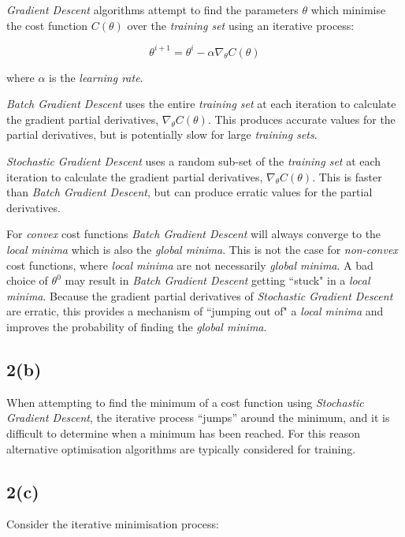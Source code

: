 \documentclass[12pt, a4paper,reqno]{article}
\begin{document}
\emph{Gradient Descent} algorithms attempt to find the parameters $\theta$ which minimise the cost function $C(\theta)$ over the \emph{training set} using an iterative process:

\begin{equation}
\theta^{i+1} = \theta^i - \alpha\nabla_\theta C(\theta)
\end{equation}

where $\alpha$ is the \emph{learning rate}.

\emph{Batch Gradient Descent} uses the entire \emph{training set} at each iteration to calculate the gradient partial derivatives, $\nabla_\theta C(\theta)$. This produces accurate values for the partial derivatives, but is potentially slow for large \emph{training sets}.

\emph{Stochastic Gradient Descent} uses a random sub-set of the \emph{training set} at each iteration to calculate the gradient partial derivatives, $\nabla_\theta C(\theta)$. This is faster than \emph{Batch Gradient Descent}, but can produce erratic values for the partial derivatives. 

For \emph{convex} cost functions \emph{Batch Gradient Descent} will always converge to the \emph{local minima} which is also the \emph{global minima}. This is not the case for \emph{non-convex} cost functions, where \emph{local minima} are not necessarily \emph{global minima}. A bad choice of $\theta^0$ may result in \emph{Batch Gradient Descent} getting ``stuck" in a \emph{local minima}. Because the gradient partial derivatives of \emph{Stochastic Gradient Descent} are erratic, this provides a mechanism of ``jumping out of" a \emph{local minima} and improves the probability of finding the \emph{global minima}.

\subsection*{2(b)}

When attempting to find the minimum of a cost function using \emph{Stochastic Gradient Descent}, the iterative process ``jumps'' around the minimum, and it is difficult to determine when a minimum has been reached. For this reason alternative optimisation algorithms are typically considered for training.

\subsection*{2(c)}
Consider the iterative minimisation process: 
\end{document}
